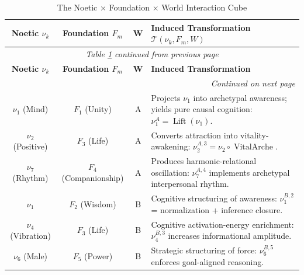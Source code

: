 \documentclass[11pt,twoside,openright]{book}
\theoremstyle{definition}
\theoremstyle{plain}
\theoremstyle{remark}
\begin{document}

\begin{longtable}{c|c|c|p{6.5cm}}
\caption{The Noetic $\times$ Foundation $\times$ World Interaction Cube}
\label{tab:noetic-foundation-world-cube} \\
\toprule
\textbf{Noetic $\nu_k$}
& \textbf{Foundation $F_m$}
& \textbf{W}
& \textbf{Induced Transformation $\mathcal{T}(\nu_k, F_m, W)$}
\\
\midrule
\endfirsthead
\multicolumn{4}{c}{\textit{Table \ref{tab:noetic-foundation-world-cube} continued from previous page}} \\
\toprule
\textbf{Noetic $\nu_k$} & \textbf{Foundation $F_m$} & \textbf{W} & \textbf{Induced Transformation} \\
\midrule
\endhead
\midrule
\multicolumn{4}{r}{\textit{Continued on next page}} \\
\endfoot
\bottomrule
\endlastfoot


$\nu_1$ (Mind) & $F_1$ (Unity) & A
& Projects $\nu_1$ into archetypal awareness; yields pure causal cognition:
  $\nu_1^{A} = \operatorname{Lift}(\nu_1)$.
\\

$\nu_2$ (Positive) & $F_3$ (Life) & A
& Converts attraction into vitality-awakening:
  $\nu_2^{A,3} = \nu_2 \circ \operatorname{VitalArche}$.
\\

$\nu_7$ (Rhythm) & $F_4$ (Companionship) & A
& Produces harmonic-relational oscillation:
  $\nu_7^{A,4}$ implements archetypal interpersonal rhythm.
\\

\midrule

$\nu_1$ & $F_2$ (Wisdom) & B
& Cognitive structuring of awareness:
  $\nu_1^{B,2}$ = normalization + inference closure.
\\

$\nu_4$ (Vibration) & $F_3$ (Life) & B
& Cognitive activation-energy enrichment:
  $\nu_4^{B,3}$ increases informational amplitude.
\\

$\nu_6$ (Male) & $F_5$ (Power) & B
& Strategic structuring of force:
  $\nu_6^{B,5}$ enforces goal-aligned reasoning.
\\


\end{longtable}
\end{document}
